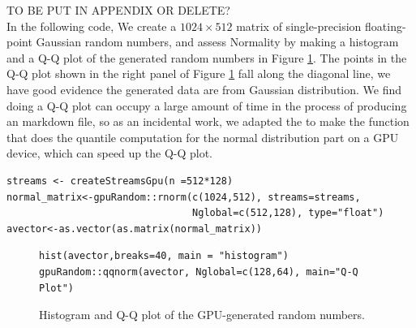 \documentclass[article,nojss]{jss}\usepackage[]{graphicx}\usepackage[]{color}
\makeatletter
\newenvironment{kframe}{%
 \def\at@end@of@kframe{}%
 \ifinner\ifhmode%
  \def\at@end@of@kframe{\end{minipage}}%
  \begin{minipage}{\columnwidth}%
 \fi\fi%
 \def\FrameCommand##1{\hskip\@totalleftmargin \hskip-\fboxsep
 \colorbox{shadecolor}{##1}\hskip-\fboxsep
     \hskip-\linewidth \hskip-\@totalleftmargin \hskip\columnwidth}%
 \MakeFramed {\advance\hsize-\width
   \@totalleftmargin\z@ \linewidth\hsize
   \@setminipage}}%
 {\par\unskip\endMakeFramed%
 \at@end@of@kframe}
\newenvironment{knitrout}{}{} %
\newcommand{\fct}[1]{\code{#1()}}
\makeatother
\begin{document}
TO BE PUT IN APPENDIX OR DELETE? \\
In the following code, We create a $1024 \times 512$ matrix of single-precision floating-point Gaussian random numbers, and assess Normality by making a histogram and a Q-Q plot of the generated random numbers in Figure \ref{fig2}. The points in the Q-Q plot shown in the right panel of Figure \ref{fig2} fall along the diagonal line, we have good evidence the generated data are from Gaussian distribution. We find doing a Q-Q plot can occupy a large amount of time in the process of producing an  markdown file, so as an incidental work, we adapted the \fct{stat::qnorm} to make the function \fct{gpuRandom::qqnorm} that does the quantile computation for the normal distribution part on a GPU device, which can speed up the Q-Q plot.
\begin{knitrout}
\color{fgcolor}\begin{kframe}
\begin{verbatim}
streams <- createStreamsGpu(n =512*128)
normal_matrix<-gpuRandom::rnorm(c(1024,512), streams=streams, 
                                Nglobal=c(512,128), type="float")
avector<-as.vector(as.matrix(normal_matrix))
\end{verbatim}
\end{kframe}
\end{knitrout}
\begin{figure}[H]
\centering
\begin{knitrout}
\color{fgcolor}\begin{kframe}
\begin{verbatim}
hist(avector,breaks=40, main = "histogram")
gpuRandom::qqnorm(avector, Nglobal=c(128,64), main="Q-Q Plot")
\end{verbatim}
\end{kframe}
\end{knitrout}
\caption{Histogram and Q-Q plot of the GPU-generated random numbers.\label{fig2}}
\end{figure}
\end{document}
